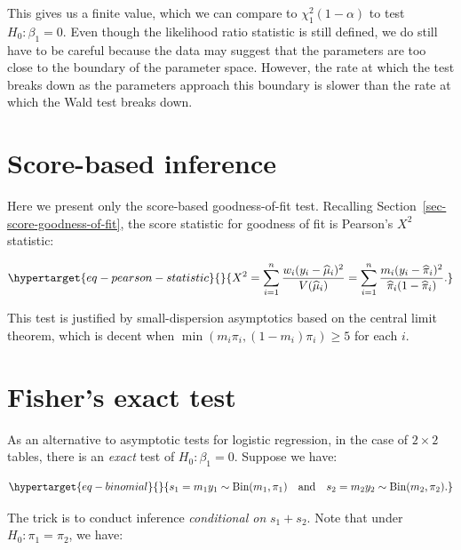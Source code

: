 \documentclass[
  11pt,
  letterpaper,
  oneside]{book}
\theoremstyle{plain}
\theoremstyle{plain}
\theoremstyle{definition}
\theoremstyle{plain}
\theoremstyle{definition}
\theoremstyle{remark}
\begin{document}
This gives us a finite value, which we can compare to
\(\chi^2_{1}(1-\alpha)\) to test \(H_0: \beta_1 = 0\). Even though the
likelihood ratio statistic is still defined, we do still have to be
careful because the data may suggest that the parameters are too close
to the boundary of the parameter space. However, the rate at which the
test breaks down as the parameters approach this boundary is slower than
the rate at which the Wald test breaks down.

\hypertarget{sec-score-based-inference}{%
\section{Score-based inference}\label{sec-score-based-inference}}

Here we present only the score-based goodness-of-fit test. Recalling
Section~\ref{sec-score-goodness-of-fit}, the score statistic for
goodness of fit is Pearson's \(X^2\) statistic:

\begin{equation}\protect\hypertarget{eq-pearson-statistic}{}{
X^2 = \sum_{i = 1}^n \frac{w_i (y_i - \widehat \mu_i)^2}{V(\widehat \mu_i)} = \sum_{i = 1}^n \frac{m_i(y_i - \widehat \pi_i)^2}{\widehat \pi_i(1-\widehat \pi_i)}.
}\label{eq-pearson-statistic}\end{equation}

This test is justified by small-dispersion asymptotics based on the
central limit theorem, which is decent when
\(\min(m_i \pi_i, (1-m_i)\pi_i) \geq 5\) for each \(i\).

\hypertarget{sec-fisher-exact-test}{%
\section{Fisher's exact test}\label{sec-fisher-exact-test}}

As an alternative to asymptotic tests for logistic regression, in the
case of \(2 \times 2\) tables, there is an \emph{exact} test of
\(H_0: \beta_1 = 0\). Suppose we have:

\begin{equation}\protect\hypertarget{eq-binomial}{}{
s_1 = m_1y_1 \sim \text{Bin}(m_1, \pi_1) \quad \text{and} \quad s_2 = m_2y_2 \sim \text{Bin}(m_2, \pi_2).
}\label{eq-binomial}\end{equation}

The trick is to conduct inference \emph{conditional on} \(s_1 + s_2\).
Note that under \(H_0: \pi_1 = \pi_2\), we have:
\end{document}
